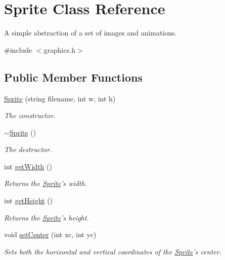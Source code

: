 \hypertarget{class_sprite}{\section{Sprite Class Reference}
\label{class_sprite}
}


A simple abstraction of a set of images and animations.  




{\ttfamily \#include $<$graphics.\-h$>$}

\subsection*{Public Member Functions}
\begin{DoxyCompactItemize}
\item 
\hyperlink{class_sprite_ae389173729bb257ec701c29830e55c38}{Sprite} (string filename, int w, int h)
\begin{DoxyCompactList}\small\item\em The constructor. \end{DoxyCompactList}\item 
\hyperlink{class_sprite_a8accab430f9d90ae5117b57d67e32b84}{$\sim$\-Sprite} ()
\begin{DoxyCompactList}\small\item\em The destructor. \end{DoxyCompactList}\item 
int \hyperlink{class_sprite_aba3d4752461ec679fbf5de7ec4c34f61}{get\-Width} ()
\begin{DoxyCompactList}\small\item\em Returns the \hyperlink{class_sprite}{Sprite}'s width. \end{DoxyCompactList}\item 
int \hyperlink{class_sprite_a67b67082cfda90103d2d9eefea04cc4b}{get\-Height} ()
\begin{DoxyCompactList}\small\item\em Returns the \hyperlink{class_sprite}{Sprite}'s height. \end{DoxyCompactList}\item 
void \hyperlink{class_sprite_ae717a7440c08698741f7642a0ea2c28b}{set\-Center} (int xc, int yc)
\begin{DoxyCompactList}\small\item\em Sets both the horizontal and vertical coordinates of the \hyperlink{class_sprite}{Sprite}'s center. \end{DoxyCompactList}\item 

\end{DoxyCompactItemize}
